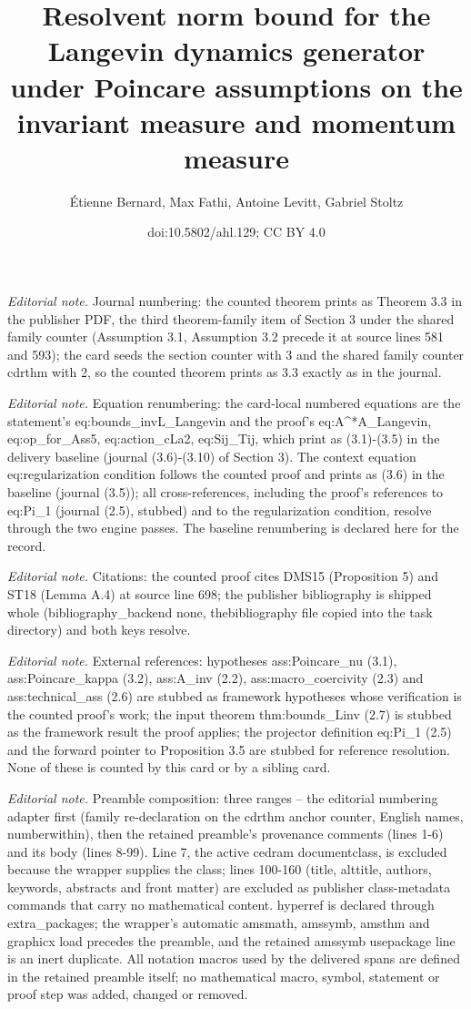 \documentclass[10pt,a4paper]{article}
\title{Resolvent norm bound for the Langevin dynamics generator under Poincare assumptions on the invariant measure and momentum measure}
\author{Étienne Bernard, Max Fathi, Antoine Levitt, Gabriel Stoltz}
\date{doi:10.5802/ahl.129; CC BY 4.0}
\numberwithin{equation}{section}
\begin{document}
\maketitle
\setcounter{section}{3}
\setcounter{cdrthm}{2}
\setcounter{equation}{0}
\noindent\textit{Editorial note.} Journal numbering: the counted theorem prints as Theorem 3.3 in the publisher PDF, the third theorem-family item of Section 3 under the shared family counter (Assumption 3.1, Assumption 3.2 precede it at source lines 581 and 593); the card seeds the section counter with 3 and the shared family counter cdrthm with 2, so the counted theorem prints as 3.3 exactly as in the journal.\par\medskip
\noindent\textit{Editorial note.} Equation renumbering: the card-local numbered equations are the statement's eq:bounds\_invL\_Langevin and the proof's eq:A\textasciicircum{}*A\_Langevin, eq:op\_for\_Ass5, eq:action\_cLa2, eq:Sij\_Tij, which print as (3.1)-(3.5) in the delivery baseline (journal (3.6)-(3.10) of Section 3). The context equation eq:regularization condition follows the counted proof and prints as (3.6) in the baseline (journal (3.5)); all cross-references, including the proof's references to eq:Pi\_1 (journal (2.5), stubbed) and to the regularization condition, resolve through the two engine passes. The baseline renumbering is declared here for the record.\par\medskip
\noindent\textit{Editorial note.} Citations: the counted proof cites DMS15 (Proposition 5) and ST18 (Lemma A.4) at source line 698; the publisher bibliography is shipped whole (bibliography\_backend none, thebibliography file copied into the task directory) and both keys resolve.\par\medskip
\noindent\textit{Editorial note.} External references: hypotheses ass:Poincare\_nu (3.1), ass:Poincare\_kappa (3.2), ass:A\_inv (2.2), ass:macro\_coercivity (2.3) and ass:technical\_ass (2.6) are stubbed as framework hypotheses whose verification is the counted proof's work; the input theorem thm:bounds\_Linv (2.7) is stubbed as the framework result the proof applies; the projector definition eq:Pi\_1 (2.5) and the forward pointer to Proposition 3.5 are stubbed for reference resolution. None of these is counted by this card or by a sibling card.\par\medskip
\noindent\textit{Editorial note.} Preamble composition: three ranges -- the editorial numbering adapter first (family re-declaration on the cdrthm anchor counter, English names, numberwithin), then the retained preamble's provenance comments (lines 1-6) and its body (lines 8-99). Line 7, the active cedram documentclass, is excluded because the wrapper supplies the class; lines 100-160 (title, alttitle, authors, keywords, abstracts and front matter) are excluded as publisher class-metadata commands that carry no mathematical content. hyperref is declared through extra\_packages; the wrapper's automatic amsmath, amssymb, amsthm and graphicx load precedes the preamble, and the retained amssymb usepackage line is an inert duplicate. All notation macros used by the delivered spans are defined in the retained preamble itself; no mathematical macro, symbol, statement or proof step was added, changed or removed.\par\medskip
\end{document}
